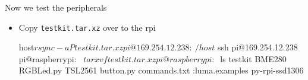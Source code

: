 \begin{frame}
   {Now we test the peripherals}

   \begin{itemize}
      \item Copy \verb?testkit.tar.xz? over to the rpi
      \begin{raw}
host$ rsync -aP testkit.tar.xz pi@169.254.12.238:~/
host$ ssh pi@169.254.12.238
pi@raspberrypi:~ $ tar xvf testkit.tar.xz 
pi@raspberrypi:~ $ ls testkit
BME280  RGBLed.py  TSL2561  button.py  commands.txt
:luma.examples  py-rpi-ssd1306
      \end{raw}

   \end{itemize}
\end{frame}

\cprotect\note{


}

